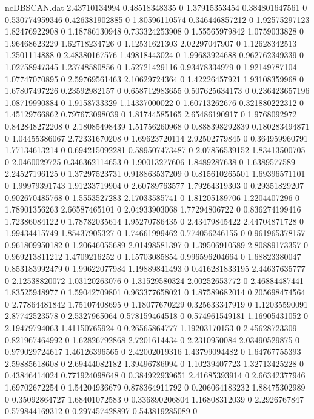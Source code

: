 \begin{filecontents}{ncDBSCAN.dat}
2.43710134994 0.48518348335 0
1.37915353454 0.384801647561 0
0.530774959346 0.426381902885 0
1.80596110574 0.346446857212 0
1.92575297123 1.82476922908 0
1.18786130948 0.733324253908 0
1.55565979842 1.0759033828 0
1.96468623229 1.62718234726 0
1.12531621303 2.02297047907 0
1.12628342513 1.2501114888 0
2.48380167576 1.49818443024 0
1.99683924688 0.962762349339 0
1.02758947345 1.23748580856 0
1.52721429116 0.93478334979 0
1.92149787104 1.07747070895 0
2.59769561463 2.10629724364 0
1.42226457921 1.93108359968 0
1.67807497226 0.23592982157 0
0.658712983655 0.507625634173 0
0.236423657196 1.08719990884 0
1.9158733329 1.14337000022 0
1.60713262676 0.321880222312 0
1.45129766862 0.797673098039 0
1.81744585165 2.65486190917 0
1.9768092972 0.842848272208 0
2.18085498439 1.51756260968 0
0.888398292839 0.180283494871 0
1.04455386067 2.72331670208 0
1.69623720114 2.92502779845 0
0.364959960791 1.77134613214 0
0.694215092281 0.589507473487 0
2.07856539152 1.83413500705 0
2.0460029725 0.346362114653 0
1.90013277606 1.8489287638 0
1.6389577589 2.24527196125 0
1.37297523731 0.918863537209 0
0.815610265501 1.69396571101 0
1.99979391743 1.91233719904 0
2.60789763577 1.79264319303 0
0.29351829207 0.902670485768 0
1.5553527283 2.17033585741 0
1.81205189706 1.2204407296 0
1.78901356263 2.66587465101 0
2.04933903068 1.77294806722 0
0.836274199416 1.72386084122 0
1.78782035614 1.95270786435 0
2.43479845422 2.44704871728 0
1.99434415749 1.85437905327 0
1.74661999462 0.774056246155 0
0.961965378157 0.961809950182 0
1.20646055689 2.01498581397 0
1.39506910589 2.80889173357 0
0.969213811212 1.4709216252 0
1.15703085854 0.996596204664 0
1.68823380047 0.853183992479 0
1.99622077984 1.19889841493 0
0.416281833195 2.44637635777 0
2.12538820072 1.03120263076 0
1.31529580324 2.00252653772 0
2.46884487441 1.83525948977 0
1.59042709801 0.963377658021 0
1.87589682014 0.205698474564 0
2.77864481842 1.75107408695 0
1.18077670229 0.325633347919 0
1.12035590091 2.87742523578 0
2.5327965064 0.578159464518 0
0.574961549181 1.16905431052 0
2.19479794063 1.41150765924 0
0.26565864777 1.19203170153 0
2.45628723309 0.821967464992 0
1.62826792868 2.7201614434 0
2.2310950084 2.03490529875 0
0.979029724617 1.46126396565 0
2.42002019316 1.43799094482 0
1.64767755393 2.59885618608 0
2.69444082182 1.39496786994 0
1.10239407723 1.32713425228 0
0.43846414024 0.771924098648 0
0.384922939651 2.41685393914 0
2.66342377946 1.69702672254 0
1.54204936679 0.878364911792 0
0.206064183232 1.88475302989 0
0.35092864727 1.68401072583 0
0.336890206804 1.16808312039 0
2.2926767847 0.579844169312 0
0.297457428897 0.543819285089 0

\end{filecontents}
